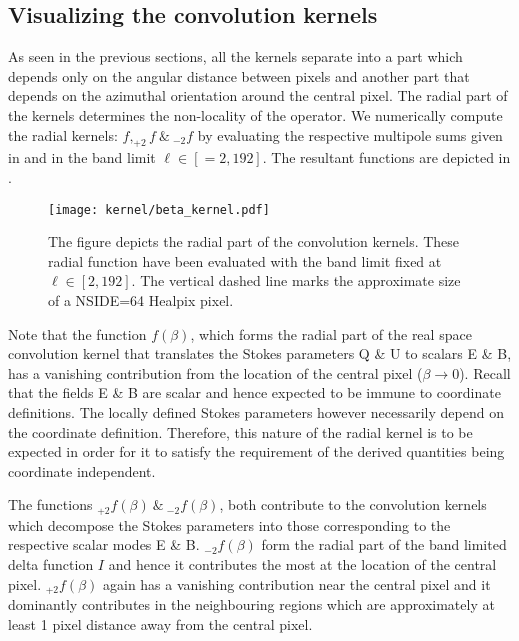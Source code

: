 
 
\subsection{Visualizing the convolution kernels} \label{sec:visualize_operator}
As seen in the previous sections, all the kernels separate into a part which depends only on the angular distance between pixels and another part that depends on the azimuthal orientation around the central pixel. The radial part of the kernels determines the non-locality of the operator. 
We numerically compute the radial kernels: $f, _{+2}f ~\&~ _{-2}f $ by evaluating the respective multipole sums given in  and  in the band limit $\ell \in [=2,192]$. The resultant functions are depicted in . 
%
\begin{figure}[!hbt]
\centering
\texttt{[image: kernel/beta\_kernel.pdf]}
\caption{The figure depicts the radial part of the convolution kernels. These radial function have been evaluated with the band limit fixed at $\ell \in [2,192]$. The vertical dashed line marks the approximate size of a NSIDE=64 Healpix pixel.}
\label{fig:beta_kernel}
\end{figure}
%
Note that the function $f(\beta)$, which forms the radial part of the real space convolution kernel that translates the Stokes parameters Q \& U to scalars E \& B, has a vanishing contribution from the location of the central pixel ($\beta \rightarrow 0$). Recall that the fields E \& B are scalar and hence expected to be immune to coordinate definitions. The locally defined Stokes parameters however necessarily depend on the coordinate definition. Therefore, this nature of the radial kernel is to be expected in order for it to satisfy the requirement of the derived quantities being coordinate independent. 

The functions $_{+2}f(\beta)~\&~_{-2}f(\beta)$, both contribute to the convolution kernels which decompose the Stokes parameters into those corresponding to the respective scalar modes E \& B. $_{-2}f(\beta)$ form the radial part of the band limited delta function $I$ and hence it contributes the most at the location of the central pixel. $_{+2}f(\beta)$ again has a vanishing contribution near the central pixel and it dominantly contributes in the neighbouring regions which are approximately at least 1 pixel distance away from the central pixel.

